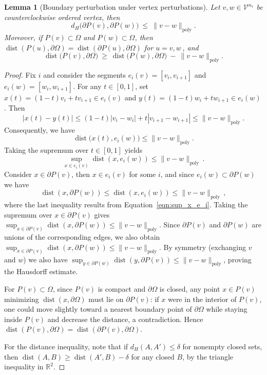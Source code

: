 \documentclass{article}
\def\Eqref#1{Equation~\ref{#1}}
\newcommand{\R}{\mathbb{R}}
\newtheorem{lemma}[theorem]{Lemma}
\newcommand{\dist}{\operatorname{dist}}
\begin{document}
\begin{lemma}[Boundary perturbation under vertex perturbations]\label{lem:dist-boundary-perturb}
Let $v,w\in \mathcal{V}^{n_{\mathrm v}}$ be counterclockwise ordered vertex, then
\[
d_H\big(\partial P(v),\partial P(w)\big)\ \le\ \|v-w\|_{\mathrm{poly}}.
\]
Moreover, if $P(v)\subset\Omega$ and $P(w)\subset\Omega$, then
$\dist(P(u),\partial\Omega)=\dist(\partial P(u),\partial\Omega)$ for $u=v,w$\,, and
\[
\dist\big(P(v),\partial\Omega\big)\ \ge\ \dist\big(P(w),\partial\Omega\big)\ -\ \|v-w\|_{\mathrm{poly}}.
\]
\end{lemma}

\begin{proof}
Fix $i$ and consider the segments $e_i(v)=[v_i,v_{i+1}]$ and $e_i(w)=[w_i,w_{i+1}]$.
For any $t\in[0,1]$, set $x(t)=(1-t)v_i+t v_{i+1}\in e_i(v)$ and $y(t)=(1-t)w_i+t w_{i+1}\in e_i(w)$.
Then
\[
|x(t)-y(t)|\le (1-t)|v_i-w_i|+t|v_{i+1}-w_{i+1}|\le \|v-w\|_{\mathrm{poly}}.
\]
Consequently, we have
\[
\dist\!\big(x(t),e_i(w)\big)\le \|v-w\|_{\mathrm{poly}}. 
\]
Taking the supremum over $t\in[0,1]$ yields
\begin{equation}\label{eqn:sup_x_e_i}
\sup_{x\in e_i(v)}\dist(x,e_i(w))\le \|v-w\|_{\mathrm{poly}}\,.
\end{equation}
Consider $x\in\partial P(v)$, then $x\in e_i(v)$ for some $i$, and since $e_i(w)\subset\partial P(w)$ we have
\[
\dist(x,\partial P(w))\le \dist(x,e_i(w))\le \|v-w\|_{\mathrm{poly}}\,,
\]
where the last inequality results from \Eqref{eqn:sup_x_e_i}.
Taking the supremum over $x\in\partial P(v)$ gives
$\sup_{x\in\partial P(v)}\dist(x,\partial P(w))\le \|v-w\|_{\mathrm{poly}}$.
Since $\partial P(v)$ and $\partial P(w)$ are unions of the corresponding edges, we also obtain
$\sup_{x\in\partial P(v)}\dist(x,\partial P(w))\le \|v-w\|_{\mathrm{poly}}$.
By symmetry (exchanging $v$ and $w$) we also have
$\sup_{y\in\partial P(w)}\dist(y,\partial P(v))\le \|v-w\|_{\mathrm{poly}}$, proving the Hausdorff estimate. 

For $P(v)\subset\Omega$, since $P(v)$ is compact and $\partial\Omega$ is closed, 
any point $x\in P(v)$ minimizing $\dist(x,\partial\Omega)$ must lie on $\partial P(v)$:
if $x$ were in the interior of $P(v)$, one could move slightly toward a nearest boundary point of $\partial\Omega$
while staying inside $P(v)$ and decrease the distance, a contradiction. Hence
$\dist(P(v),\partial\Omega)=\dist(\partial P(v),\partial\Omega)$.

For the distance inequality, note that if $d_H(A,A')\le \delta$ for nonempty closed sets, then
$\dist(A,B)\ge \dist(A',B)-\delta$ for any closed $B$, by the triangle inequality in $\R^2$. 
\end{proof}
\end{document}
